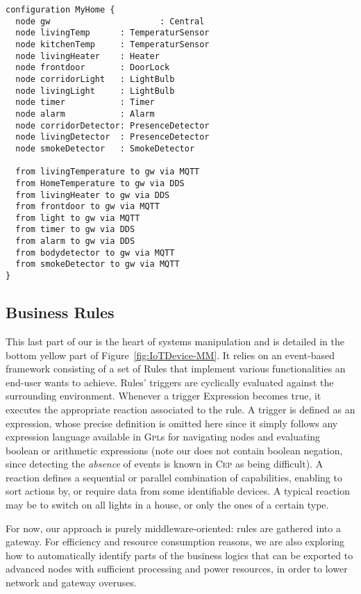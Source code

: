 \vspace*{0.1cm}  
\begin{lstlisting}[label=lis:RE-Network,language=iotdsl,caption=Network Configuration for Alice's House]	
configuration MyHome {
  node gw 					   : Central
  node livingTemp      : TemperaturSensor
  node kitchenTemp     : TemperaturSensor
  node livingHeater    : Heater
  node frontdoor       : DoorLock
  node corridorLight   : LightBulb
  node livingLight     : LightBulb
  node timer           : Timer
  node alarm           : Alarm
  node corridorDetector: PresenceDetector
  node livingDetector  : PresenceDetector
  node smokeDetector   : SmokeDetector
  
  from livingTemperature to gw via MQTT
  from HomeTemperature to gw via DDS
  from livingHeater to gw via DDS
  from frontdoor to gw via MQTT
  from light to gw via MQTT
  from timer to gw via DDS
  from alarm to gw via DDS
  from bodydetector to gw via MQTT
  from smokeDetector to gw via MQTT
}
\end{lstlisting}

\subsection{Business Rules}
\label{sec:IoTDSL-BusinessRules}

This last part of our \DSL is the heart of \IOT systems manipulation and is detailed in the bottom yellow part of Figure~\ref{fig:IoTDevice-MM}. It relies on an event-based framework consisting of a set of \textsf{Rule}s that implement various functionalities an end-user wants to achieve. Rules' \textsf{trigger}s are cyclically evaluated against the surrounding environment. Whenever a \textsf{trigger} \textsf{Expression} becomes true, it executes the appropriate \textsf{reaction} associated to the rule. A \textsf{trigger} is defined as an expression, whose precise definition is omitted here since it simply follows any expression language available in \textsc{Gpl}s for navigating nodes and evaluating boolean or arithmetic expressions (note our \DSL does not contain boolean negation, since detecting the \emph{absence} of events is known in \textsc{Cep} as being difficult). A \textsf{reaction} defines a sequential or parallel combination of capabilities, enabling to sort actions by, or require data from some identifiable devices. A typical \textsf{reaction} may be to switch on all lights in a house, or only the ones of a certain type.

For now, our approach is purely middleware-oriented: rules are gathered into a gateway. For efficiency and resource consumption reasons, we are also exploring how to automatically identify parts of the business logics that can be exported to advanced nodes with sufficient processing and power resources, in order to lower network and gateway overuses.

